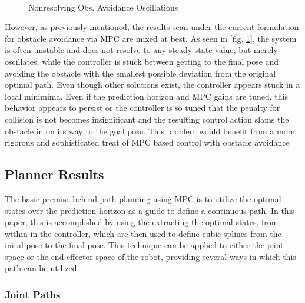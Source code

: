 \documentclass[journal]{IEEEtran}
\begin{document}
\begin{figure}[ht]%
    \centering
    \\
    \caption{Nonresolving Obs. Avoidance Oscillations}%
    \label{fig:obs_avoid_path_bad}%
\end{figure}

However, as previously mentioned, the results sean under the current formulation for obstacle avoidance via MPC are mixed at best. As seen in [fig. \ref{fig:obs_avoid_path_bad}], the system is often unstable and does not resolve to any steady state value, but merely oscillates, while the controller is stuck between getting to the final pose and avoiding the obstacle with the smallest possible deviation from the original optimal path. Even though other solutions exist, the controller appears stuck in a local minimima. Even if the prediction horizon and MPC gains are tuned, this behavior appears to persist or the controller is so tuned that the penalty for collision is not becomes insignificant and the resulting control action slams the obstacle in on its way to the goal pose. This problem would benefit from a more rigorous and sophisticated treat of MPC based control with obstacle avoidance


\subsection{Planner Results}

The basic premise behind path planning using MPC is to utilize the optimal states over the prediction horizon as a guide to define a continuous path. In this paper, this is accomplished by using the extracting the optimal states, from within in the controller, which are then used to define cubic splines from the inital pose to the final pose. This technique can be applied to either the joint space or the end effector space of the robot, providing several ways in which this path can be utilized. 

\subsubsection{Joint Paths}
\end{document}
